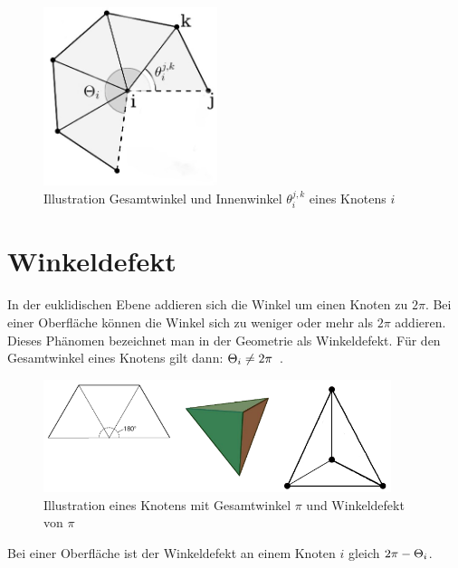 \begin{figure}[H]%
    \centering
  \includegraphics[width=2in]{images/gesammtwinkel.jpg}
  \caption{Illustration Gesamtwinkel \gesamtwinkel und Innenwinkel  $\theta_i^{j,k}$  eines Knotens $i$  \cite{Sharp:2019:NIT}}
\end{figure}
 
\section*{Winkeldefekt}
\label{def:winkeldefekt}
In der euklidischen Ebene addieren sich die Winkel um einen Knoten zu $2\pi$. Bei einer Oberfläche können die Winkel sich zu weniger oder mehr als $2\pi$ addieren.\\
Dieses Phänomen bezeichnet man in der Geometrie als Winkeldefekt. Für den Gesamtwinkel eines Knotens gilt dann: $\gesamtwinkel* \neq 2\pi$~\cite{richeson:2012:euler}.\\
\begin{figure}[H]%
    \centering
  \includegraphics[width=4in]{images/winkeldefekt_polyder_2.png}
  \caption{Illustration eines Knotens mit Gesamtwinkel $\pi$ und  Winkeldefekt von $\pi$ \cite{Koch_2019_CVPR}}
\end{figure}
 
 Bei einer Oberfläche ist der Winkeldefekt an einem Knoten $i$ gleich $2\pi - \gesamtwinkel* $. 

